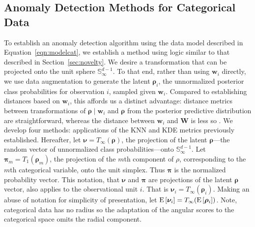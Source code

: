 \subsection{Anomaly Detection Methods for Categorical Data\label{subsec:catscores}}
To establish an anomaly detection algorithm using the data model described in 
  Equation~\ref{eqn:modelcat}, we establish a method using logic similar to that
  described in Section~\ref{sec:novelty}.  We desire a transformation that can be
  projected onto the unit sphere $\mathbb{S}_{\infty}^{d-1}$.  To that end, rather
  than using $\bm{w}_i$ directly, we use data augmentation to generate the latent 
  $\bm{\rho}_i$, the unnormalized posterior class probabilities for observation $i$, 
  sampled given $\bm{w}_i$.  Compared to establishing distances based on $\bm{w}_i$, 
  this affords us a distinct advantage: distance metrics between transformations of
  $\bm{\rho}\mid\bm{w}_i$ and $\bm{\rho}$ from the posterior predictive 
  distribution are straightforward, whereas the distance between $\bm{w}_i$ and $\bm{W}$ 
  is less so \cite{Alamuri2014}. We develop four methods: applications of the KNN and 
  KDE metrics previously established.  Hereafter, let $\bm{\nu} = T_{\infty}\left(\bm{\rho}\right)$, 
  the projection of the latent $\bm{\rho}$---the random vector of unnormalized class 
  probabilities---onto $\mathbb{S}_{\infty}^{d-1}$.  Let $\bm{\pi}_{m} = T_{1}(\bm{\rho}_m)$,
  the projection of the $m$th component of $\rho$, corresponding to the $m$th categorical 
  variable, onto the unit simplex. Thus $\bm{\pi}$ is the normalized probability vector.
  This notation, that $\bm{\nu}$ and $\bm{\pi}$ are projections of the latent $\bm{\rho}$ vector, also applies
  to the observational unit $i$.  That is $\bm{\nu}_i = T_{\infty}(\bm{\rho}_i)$.
  Making an abuse of notation for simplicity of presentation, 
  let $\text{E}\left[\bm{\nu}_i\right] = T_{\infty}(\text{E}\left[\bm{\rho}_i\right])$.
  Note, categorical data has no radius so the adaptation of the angular scores to
  the categorical space omits the radial component.

